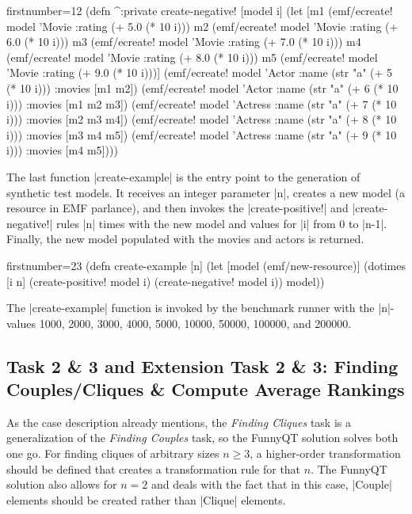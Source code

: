 \documentclass[a4paper]{article}
\newcommand{\code}{\clojureinline}
\begin{document}
\begin{clojurecode*}{firstnumber=12}
(defn ^:private create-negative! [model i]
  (let [m1 (emf/ecreate! model 'Movie :rating (+ 5.0 (* 10 i)))
        m2 (emf/ecreate! model 'Movie :rating (+ 6.0 (* 10 i)))
        m3 (emf/ecreate! model 'Movie :rating (+ 7.0 (* 10 i)))
        m4 (emf/ecreate! model 'Movie :rating (+ 8.0 (* 10 i)))
        m5 (emf/ecreate! model 'Movie :rating (+ 9.0 (* 10 i)))]
    (emf/ecreate! model 'Actor   :name (str "a" (+ 5 (* 10 i))) :movies [m1 m2])
    (emf/ecreate! model 'Actor   :name (str "a" (+ 6 (* 10 i))) :movies [m1 m2 m3])
    (emf/ecreate! model 'Actress :name (str "a" (+ 7 (* 10 i))) :movies [m2 m3 m4])
    (emf/ecreate! model 'Actress :name (str "a" (+ 8 (* 10 i))) :movies [m3 m4 m5])
    (emf/ecreate! model 'Actress :name (str "a" (+ 9 (* 10 i))) :movies [m4 m5])))
\end{clojurecode*}

The last function \code|create-example| is the entry point to the generation of
synthetic test models.  It receives an integer parameter \code|n|, creates a
new model (a resource in EMF parlance), and then invokes the
\code|create-positive!| and \code|create-negative!| rules \code|n| times with
the new model and values for \code|i| from 0 to \code|n-1|.  Finally, the new
model populated with the movies and actors is returned.

\begin{clojurecode*}{firstnumber=23}
(defn create-example [n]
  (let [model (emf/new-resource)]
    (dotimes [i n]
      (create-positive! model i)
      (create-negative! model i))
    model))
\end{clojurecode*}

The \code|create-example| function is invoked by the benchmark runner with the
\code|n|-values 1000, 2000, 3000, 4000, 5000, 10000, 50000, 100000, and 200000.

\subsection{Task 2 \& 3 and Extension Task 2 \& 3: Finding Couples/Cliques \&
  Compute Average Rankings}
\label{sec:task-2:finding-groups}

As the case description already mentions, the \emph{Finding Cliques} task is a
generalization of the \emph{Finding Couples} task, so the FunnyQT solution
solves both one go.  For finding cliques of arbitrary sizes \(n \geq 3\),
a higher-order transformation should be defined that creates a transformation
rule for that \(n\).
The FunnyQT solution also allows for \(n = 2\)
and deals with the fact that in this case, \code|Couple| elements should be
created rather than \code|Clique| elements.
\end{document}
